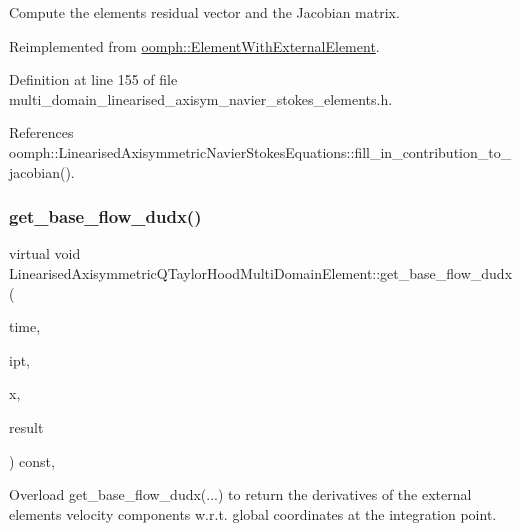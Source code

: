 Compute the element\textquotesingle{}s residual vector and the Jacobian matrix. 



Reimplemented from \hyperlink{classoomph_1_1ElementWithExternalElement_ae5fb09552a8271e891438f8d058ca1b8}{oomph\+::\+Element\+With\+External\+Element}.



Definition at line 155 of file multi\+\_\+domain\+\_\+linearised\+\_\+axisym\+\_\+navier\+\_\+stokes\+\_\+elements.\+h.



References oomph\+::\+Linearised\+Axisymmetric\+Navier\+Stokes\+Equations\+::fill\+\_\+in\+\_\+contribution\+\_\+to\+\_\+jacobian().

\mbox{\label{classLinearisedAxisymmetricQTaylorHoodMultiDomainElement_a88bdf14ec298be7083e97d0312d7e968}} 
\subsubsection{\texorpdfstring{get\+\_\+base\+\_\+flow\+\_\+dudx()}{get\_base\_flow\_dudx()}}
{\footnotesize\ttfamily virtual void Linearised\+Axisymmetric\+Q\+Taylor\+Hood\+Multi\+Domain\+Element\+::get\+\_\+base\+\_\+flow\+\_\+dudx (\begin{DoxyParamCaption}\item[{const double \&}]{time,  }\item[{const unsigned \&}]{ipt,  }\item[{const \hyperlink{classoomph_1_1Vector}{Vector}$<$ double $>$ \&}]{x,  }\item[{\hyperlink{classoomph_1_1DenseMatrix}{Dense\+Matrix}$<$ double $>$ \&}]{result }\end{DoxyParamCaption}) const\hspace{0.3cm}{\ttfamily [inline]}, {\ttfamily [virtual]}}



Overload get\+\_\+base\+\_\+flow\+\_\+dudx(...) to return the derivatives of the external element\textquotesingle{}s velocity components w.\+r.\+t. global coordinates at the integration point. 



